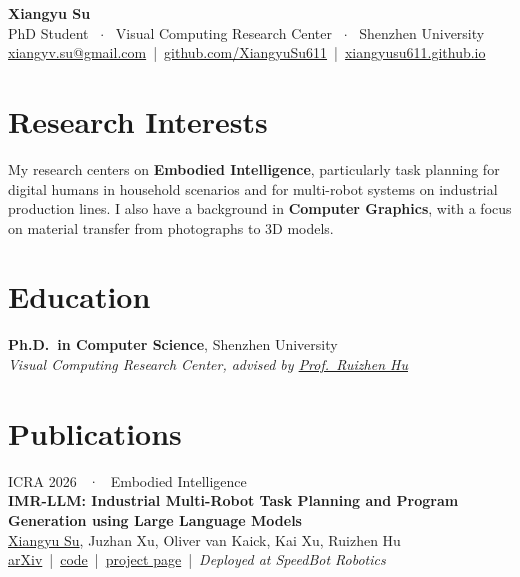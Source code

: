 \documentclass[11pt,a4paper]{article}
\newcommand{\entry}[2]{%
  \noindent
  \begin{minipage}[t]{0.76\textwidth}\RaggedRight #1\end{minipage}%
  \hfill
  \begin{minipage}[t]{0.22\textwidth}\RaggedLeft{\small\color{muted}#2}\end{minipage}%
  \par\vspace{3pt}
}
\newcommand{\pub}[5]{%
  \entry{%
    {\footnotesize\labelfont\color{accent}#1}\\[1pt]
    \textbf{#2}\\[1pt]
    {\small #3}\\[1pt]
    {\footnotesize\color{muted}#4}%
  }{#5}%
  \vspace{4pt}%
}
\newcommand{\role}[4]{%
  \entry{\textbf{#1}, #2\\[1pt]{\small\color{muted}\textit{#3}}}{#4}%
}
\begin{document}
\begin{center}
  {\headingfont\Huge\bfseries Xiangyu Su}\\[4pt]
  {\small\color{muted}PhD Student \, $\cdot$ \, Visual Computing Research Center \, $\cdot$ \, Shenzhen University}\\[6pt]
  {\footnotesize
    \href{mailto:xiangyv.su@gmail.com}{xiangyv.su@gmail.com}
    \textcolor{rule}{\,|\,}
    \href{https://github.com/XiangyuSu611}{github.com/XiangyuSu611}
    \textcolor{rule}{\,|\,}
    \href{https://xiangyusu611.github.io}{xiangyusu611.github.io}
  }
\end{center}
\vspace{2pt}

\section*{Research Interests}
My research centers on \textbf{Embodied Intelligence}, particularly task planning for
digital humans in household scenarios and for multi-robot systems on industrial
production lines. I also have a background in \textbf{Computer Graphics}, with a focus
on material transfer from photographs to 3D models.

\section*{Education}

\role{Ph.D.\ in Computer Science}{Shenzhen University}%
  {Visual Computing Research Center, advised by \href{https://csse.szu.edu.cn/staff/ruizhenhu/}{Prof.\ Ruizhen Hu}}%
  {Sep 2023 -- Present}


\section*{Publications}

\pub{ICRA 2026 \, · \, Embodied Intelligence}%
    {IMR-LLM: Industrial Multi-Robot Task Planning and Program Generation using Large Language Models}%
    {\underline{Xiangyu Su}, Juzhan Xu, Oliver van Kaick, Kai Xu, Ruizhen Hu}%
    {\href{https://arxiv.org/abs/2603.02669}{arXiv} \,|\, \href{https://github.com/XiangyuSu611/IMR-LLM-Code}{code} \,|\, \href{https://xiangyusu611.github.io/imr-llm/}{project page} \,|\, \textit{Deployed at SpeedBot Robotics}}%
    {2026}
\end{document}

